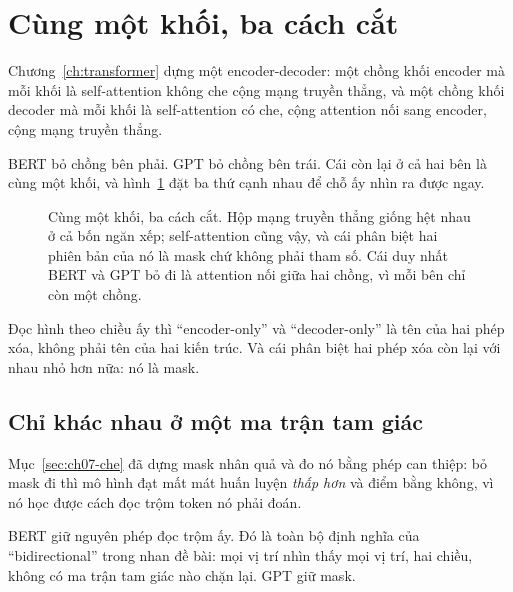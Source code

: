 \section{Cùng một khối, ba cách cắt}
\label{sec:ch09-cung-mot-khoi}

%
Chương~\ref{ch:transformer} dựng một encoder-decoder: một chồng khối encoder mà
mỗi khối là self-attention không che cộng mạng truyền thẳng, và một chồng khối
decoder mà mỗi khối là self-attention có che, cộng attention nối sang encoder,
cộng mạng truyền thẳng.

BERT bỏ chồng bên phải. GPT bỏ chồng bên trái. Cái còn lại ở cả hai bên là cùng
một khối, và hình~\ref{fig:ch09-ba-cach-cat} đặt ba thứ cạnh nhau để chỗ ấy nhìn
ra được ngay.

\begin{figure}[htbp]
  \centering
  
  \caption{Cùng một khối, ba cách cắt. Hộp mạng truyền thẳng giống hệt nhau ở cả
  bốn ngăn xếp; self-attention cũng vậy, và cái phân biệt hai phiên bản của nó
  là mask chứ không phải tham số. Cái duy nhất BERT và GPT bỏ đi là attention
  nối giữa hai chồng, vì mỗi bên chỉ còn một chồng.}
  \label{fig:ch09-ba-cach-cat}
\end{figure}

Đọc hình theo chiều ấy thì \enquote{encoder-only} và \enquote{decoder-only} là
tên của hai phép xóa, không phải tên của hai kiến trúc. Và cái phân biệt hai
phép xóa còn lại với nhau nhỏ hơn nữa: nó là mask.

\subsection*{Chỉ khác nhau ở một ma trận tam giác}

%
Mục~\ref{sec:ch07-che} đã dựng mask nhân quả và đo nó bằng phép can thiệp: bỏ
mask đi thì mô hình đạt mất mát huấn luyện \emph{thấp hơn} và điểm bằng không,
vì nó học được cách đọc trộm token nó phải đoán.

BERT giữ nguyên phép đọc trộm ấy. Đó là toàn bộ định nghĩa của
\enquote{bidirectional} trong nhan đề bài: mọi vị trí nhìn thấy mọi vị trí, hai
chiều, không có ma trận tam giác nào chặn lại. GPT giữ mask.


